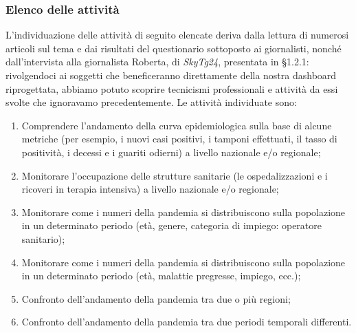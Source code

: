 \subsubsection{Elenco delle attività}
L'individuazione delle attività di seguito elencate deriva dalla lettura di numerosi articoli sul tema e dai risultati del questionario sottoposto ai giornalisti, nonché dall'intervista alla giornalista Roberta, di \textit{SkyTg24}, presentata in §1.2.1: rivolgendoci ai soggetti che beneficeranno direttamente della nostra dashboard riprogettata, abbiamo potuto scoprire tecnicismi professionali e attività da essi svolte che ignoravamo precedentemente.
\noindent
Le attività individuate sono:
\begin{enumerate}
    \item Comprendere l'andamento della curva epidemiologica sulla base di alcune metriche (per esempio, i nuovi casi positivi, i tamponi effettuati, il tasso di positività, i decessi e i guariti odierni) a livello nazionale e/o regionale;\label{itm:1}
    \item Monitorare l'occupazione delle strutture sanitarie (le ospedalizzazioni e i ricoveri in terapia intensiva) a livello nazionale e/o regionale;\label{itm:2}
    \item Monitorare come i numeri della pandemia si distribuiscono sulla popolazione in un determinato periodo (età, genere, categoria di impiego: operatore sanitario);\label{itm:3}
    \item Monitorare come i numeri della pandemia si distribuiscono sulla popolazione in un determinato periodo (età, malattie pregresse, impiego, ecc.);\label{itm:4}
    \item Confronto dell'andamento della pandemia tra due o più regioni;\label{itm:5}
    \item Confronto dell'andamento della pandemia tra due periodi temporali differenti.\label{itm:6}
\end{enumerate}

